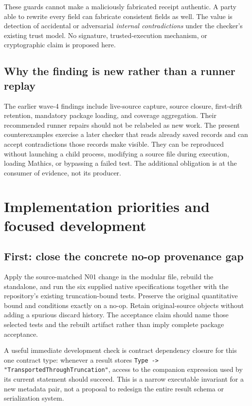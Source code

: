 \documentclass[11pt,letterpaper]{article}
\newcommand{\prop}[1]{\texttt{#1}}
\begin{document}
These guards cannot make a maliciously fabricated receipt authentic. A party
able to rewrite every field can fabricate consistent fields as well. The value
is detection of accidental or adversarial \emph{internal contradictions} under
the checker's existing trust model. No signature, trusted-execution mechanism,
or cryptographic claim is proposed here.

\subsection{Why the finding is new rather than a runner replay}

The earlier wave-4 findings include live-source capture, source closure,
first-drift retention, mandatory package loading, and coverage aggregation. Their
recommended runner repairs should not be relabeled as new work. The present
counterexamples exercise a later checker that reads already saved records and
can accept contradictions those records make visible. They can be reproduced
without launching a child process, modifying a source file during execution,
loading Mathics, or bypassing a failed test. The additional obligation is at the
consumer of evidence, not its producer.\cite{w4,r36,checkercommit}

\section{Implementation priorities and focused development}
\label{sec:plan}

\subsection{First: close the concrete no-op provenance gap}

Apply the source-matched N01 change in the modular file, rebuild the standalone,
and run the six supplied native specifications together with the repository's
existing truncation-bound tests. Preserve the original quantitative bound and
conditions exactly on a no-op. Retain original-source objects without adding a
spurious discard history. The acceptance claim should name those selected tests
and the rebuilt artifact rather than imply complete package acceptance.

A useful immediate development check is contract dependency closure for this one
contract type: whenever a result stores
\prop{Type -> "TransportedThroughTruncation"}, access to the companion expression
used by its current statement should succeed. This is a narrow executable
invariant for a new metadata pair, not a proposal to redesign the entire result
schema or serialization system.
\end{document}
